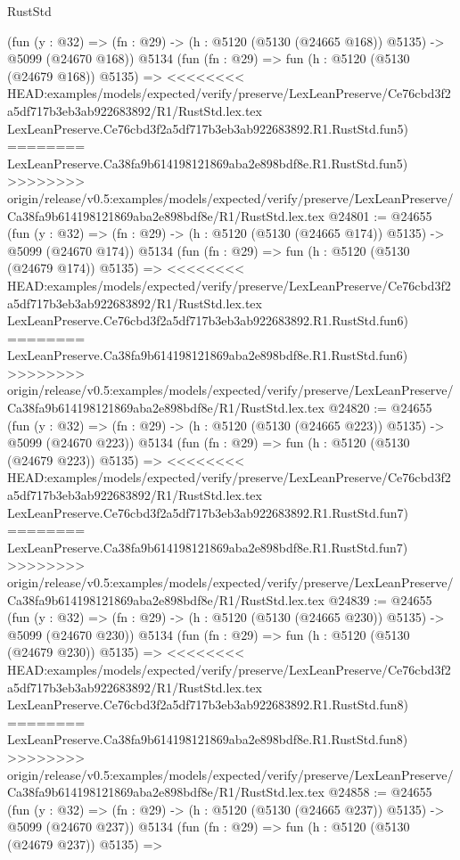 \begin{lexlean}{RustStd}
\begin{coremodule}
{\begin{coremodule}
{{{{{{{{{{{{{{{{{{{{{{{{{{{{{{{    (fun (y : @32) => (fn : @29) -> (h : @5120 (@5130 (@24665 @168)) @5135) -> @5099 (@24670 @168))
    @5134
    (fun (fn : @29) =>
    fun (h : @5120 (@5130 (@24679 @168)) @5135) =>
<<<<<<<< HEAD:examples/models/expected/verify/preserve/LexLeanPreserve/Ce76cbd3f2a5df717b3eb3ab922683892/R1/RustStd.lex.tex
    LexLeanPreserve.Ce76cbd3f2a5df717b3eb3ab922683892.R1.RustStd.fun5)
========
    LexLeanPreserve.Ca38fa9b614198121869aba2e898bdf8e.R1.RustStd.fun5)
>>>>>>>> origin/release/v0.5:examples/models/expected/verify/preserve/LexLeanPreserve/Ca38fa9b614198121869aba2e898bdf8e/R1/RustStd.lex.tex
@24801 := @24655
    (fun (y : @32) => (fn : @29) -> (h : @5120 (@5130 (@24665 @174)) @5135) -> @5099 (@24670 @174))
    @5134
    (fun (fn : @29) =>
    fun (h : @5120 (@5130 (@24679 @174)) @5135) =>
<<<<<<<< HEAD:examples/models/expected/verify/preserve/LexLeanPreserve/Ce76cbd3f2a5df717b3eb3ab922683892/R1/RustStd.lex.tex
    LexLeanPreserve.Ce76cbd3f2a5df717b3eb3ab922683892.R1.RustStd.fun6)
========
    LexLeanPreserve.Ca38fa9b614198121869aba2e898bdf8e.R1.RustStd.fun6)
>>>>>>>> origin/release/v0.5:examples/models/expected/verify/preserve/LexLeanPreserve/Ca38fa9b614198121869aba2e898bdf8e/R1/RustStd.lex.tex
@24820 := @24655
    (fun (y : @32) => (fn : @29) -> (h : @5120 (@5130 (@24665 @223)) @5135) -> @5099 (@24670 @223))
    @5134
    (fun (fn : @29) =>
    fun (h : @5120 (@5130 (@24679 @223)) @5135) =>
<<<<<<<< HEAD:examples/models/expected/verify/preserve/LexLeanPreserve/Ce76cbd3f2a5df717b3eb3ab922683892/R1/RustStd.lex.tex
    LexLeanPreserve.Ce76cbd3f2a5df717b3eb3ab922683892.R1.RustStd.fun7)
========
    LexLeanPreserve.Ca38fa9b614198121869aba2e898bdf8e.R1.RustStd.fun7)
>>>>>>>> origin/release/v0.5:examples/models/expected/verify/preserve/LexLeanPreserve/Ca38fa9b614198121869aba2e898bdf8e/R1/RustStd.lex.tex
@24839 := @24655
    (fun (y : @32) => (fn : @29) -> (h : @5120 (@5130 (@24665 @230)) @5135) -> @5099 (@24670 @230))
    @5134
    (fun (fn : @29) =>
    fun (h : @5120 (@5130 (@24679 @230)) @5135) =>
<<<<<<<< HEAD:examples/models/expected/verify/preserve/LexLeanPreserve/Ce76cbd3f2a5df717b3eb3ab922683892/R1/RustStd.lex.tex
    LexLeanPreserve.Ce76cbd3f2a5df717b3eb3ab922683892.R1.RustStd.fun8)
========
    LexLeanPreserve.Ca38fa9b614198121869aba2e898bdf8e.R1.RustStd.fun8)
>>>>>>>> origin/release/v0.5:examples/models/expected/verify/preserve/LexLeanPreserve/Ca38fa9b614198121869aba2e898bdf8e/R1/RustStd.lex.tex
@24858 := @24655
    (fun (y : @32) => (fn : @29) -> (h : @5120 (@5130 (@24665 @237)) @5135) -> @5099 (@24670 @237))
    @5134
    (fun (fn : @29) =>
    fun (h : @5120 (@5130 (@24679 @237)) @5135) =>
}}}}}}}}}}}}}}}}}}}}}}}}}}}}}}}
\end{coremodule}}
\end{coremodule}
\end{lexlean}
